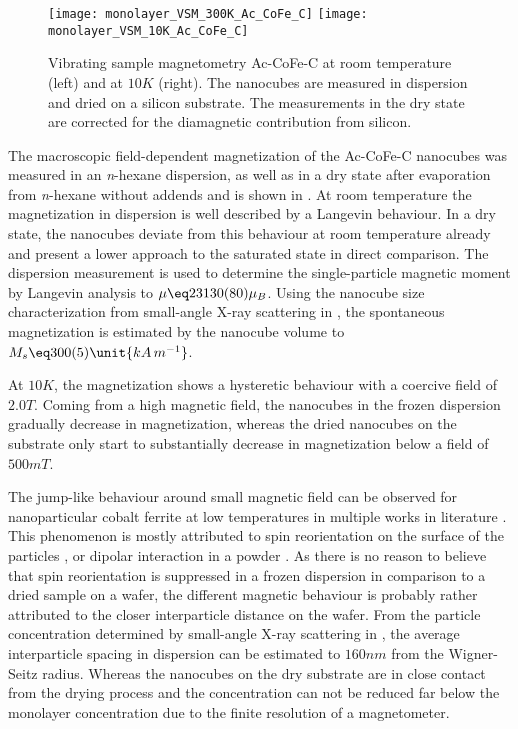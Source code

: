 \documentclass[\main/dresen_thesis.tex]{subfiles}
\begin{document}
  \label{sec:monolayers:nanoparticle:vsm}

  \begin{figure}[tb]
    \centering
    \texttt{[image: monolayer\_VSM\_300K\_Ac\_CoFe\_C]}
    \texttt{[image: monolayer\_VSM\_10K\_Ac\_CoFe\_C]}
    \caption{\label{fig:monolayers:nanoparticle:vsmAcCoFeC}Vibrating sample magnetometry Ac-CoFe-C at room temperature (left) and at $10 \unit{K}$ (right). The nanocubes are measured in dispersion and dried on a silicon substrate. The measurements in the dry state are corrected for the diamagnetic contribution from silicon.}
  \end{figure}

  The macroscopic field-dependent magnetization of the Ac-CoFe-C nanocubes was measured in an \textit{n}-hexane dispersion, as well as in a dry state after evaporation from \textit{n}-hexane without addends and is shown in .
  At room temperature the magnetization in dispersion is well described by a Langevin behaviour.
  In a dry state, the nanocubes deviate from this behaviour at room temperature already and present a lower approach to the saturated state in direct comparison.
  The dispersion measurement is used to determine the single-particle magnetic moment by Langevin analysis to $\mu \eq 23130(80) \mu_B$.
  Using the nanocube size characterization from small-angle X-ray scattering in , the spontaneous magnetization is estimated by the nanocube volume to $M_s \eq 300(5) \unit{kA\, m^{-1}}$.

  At $10 \unit{K}$, the magnetization shows a hysteretic behaviour with a coercive field of $2.0 \unit{T}$.
  Coming from a high magnetic field, the nanocubes in the frozen dispersion gradually decrease in magnetization, whereas the dried nanocubes on the substrate only start to substantially decrease in magnetization below a field of $500 \unit{mT}$.

  The jump-like behaviour around small magnetic field can be observed for nanoparticular cobalt ferrite at low temperatures in multiple works in literature \cite{Xu_2015_Simul, Alves_2017_Waspw, Geng_2016_Highm, Jung_2005_CoFe2, Fu_2012_Uniqu, Tirosh_2005_Optim}.
  This phenomenon is mostly attributed to spin reorientation on the surface of the particles \cite{Xu_2015_Simul, Fu_2012_Uniqu, Geng_2016_Highm}, or dipolar interaction in a powder \cite{Alves_2017_Waspw}.
  As there is no reason to believe that spin reorientation is suppressed in a frozen dispersion in comparison to a dried sample on a wafer, the different magnetic behaviour is probably rather attributed to the closer interparticle distance on the wafer.
  From the particle concentration determined by small-angle X-ray scattering in , the average interparticle spacing in dispersion can be estimated to $160 \unit{nm}$ from the Wigner-Seitz radius.
  Whereas the nanocubes on the dry substrate are in close contact from the drying process and the concentration can not be reduced far below the monolayer concentration due to the finite resolution of a magnetometer.
\end{document}
